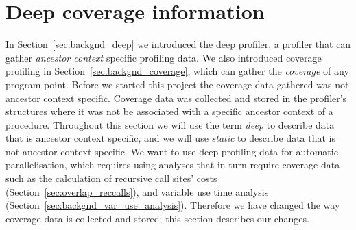 \section{Deep coverage information}
\label{sec:overlap_coverage}


In Section~\ref{sec:backgnd_deep} we introduced the deep profiler,
a profiler that can gather \emph{ancestor context} specific profiling data.
We also introduced coverage profiling in Section~\ref{sec:backgnd_coverage},
which can gather the \emph{coverage} of any program point.
Before we started this project the coverage data gathered was not ancestor
context specific.
Coverage data was collected and stored in the profiler's \PS
structures where it was not be associated with a specific ancestor context of
a procedure.
Throughout this section we will use the term \emph{deep} to describe data
that is ancestor context specific,
and we will use \emph{static} to describe data that is not ancestor
context specific.
We want to use deep profiling data for automatic parallelisation,
which requires using analyses that in turn require coverage data such as
the calculation of recursive call sites' costs
(Section~\ref{sec:overlap_reccalls}),
and variable use time analysis (Section~\ref{sec:backgnd_var_use_analysis}).
Therefore we have changed the way coverage data is collected and stored;
this section describes our changes.

